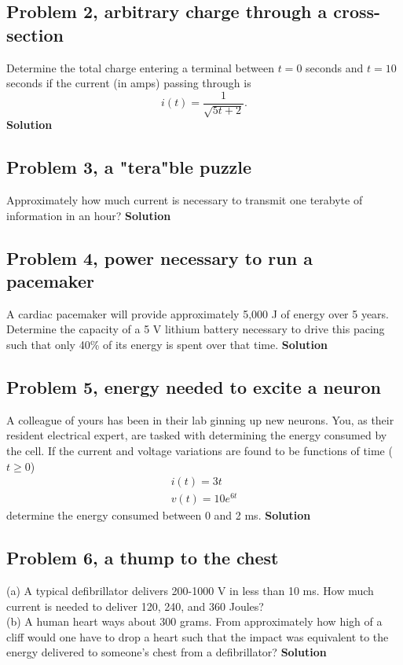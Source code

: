 \documentclass[11pt]{book}
\begin{document}
\subsection{Problem 2, arbitrary charge through a cross-section}
Determine the total charge entering a terminal between $t = 0$ seconds and $t = 10$ seconds if the current (in amps) passing through is
\begin{equation}
	i(t) = \frac{1}{\sqrt{5t+2}}. 
\end{equation} 
\textbf{Solution}


\subsection{Problem 3, a "tera"ble puzzle}
Approximately how much current is necessary to transmit one terabyte of information in an hour?
\textbf{Solution}


\subsection{Problem 4, power necessary to run a pacemaker}
A cardiac pacemaker will provide approximately 5,000 J of energy over 5 years. Determine the capacity of a 5 V lithium battery necessary to drive this pacing such that only 40\% of its energy is spent over that time.
\textbf{Solution}


\subsection{Problem 5, energy needed to excite a neuron}
A colleague of yours has been in their lab ginning up new neurons. You, as their resident electrical expert, are tasked with determining the energy consumed by the cell. If the current and voltage variations are found to be functions of time ($t \geq 0$)
\begin{eqnarray}
	i(t) = 3t \\
	v(t) = 10 e^{6t}
\end{eqnarray}
determine the energy consumed between 0 and 2 ms.
\textbf{Solution}


\subsection{Problem 6, a thump to the chest}
(a) A typical defibrillator delivers 200-1000 V in less than 10 ms. How much current is needed to deliver 120, 240, and 360 Joules?
\\
(b) A human heart ways about 300 grams. From approximately how high of a cliff would one have to drop a heart such that the impact was equivalent to the energy delivered to someone's chest from a defibrillator?
\textbf{Solution}
\end{document}
